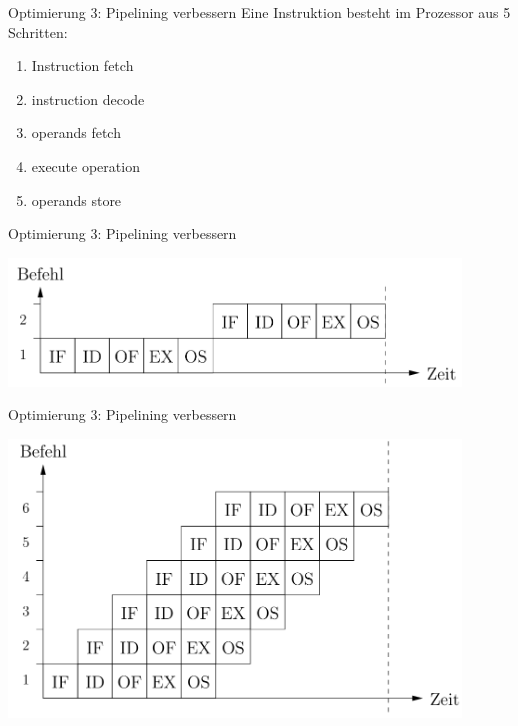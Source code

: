 \documentclass{beamer}
\begin{document}
\begin{frame}{Optimierung 3: Pipelining verbessern}
Eine Instruktion besteht im Prozessor aus 5 Schritten:\\
\begin{enumerate}
    \item Instruction fetch
    
    \item instruction decode
    
    \item operands fetch
    
    \item execute operation
    
    \item operands store
\end{enumerate}
\end{frame}

\begin{frame}{Optimierung 3: Pipelining verbessern}
\centerline{\includegraphics[width=12cm]{if1.png}}
\end{frame}

%
%
%
\begin{frame}{Optimierung 3: Pipelining verbessern}
\centerline{\includegraphics[width=12cm]{if2.png}}
\end{frame}
\end{document}
